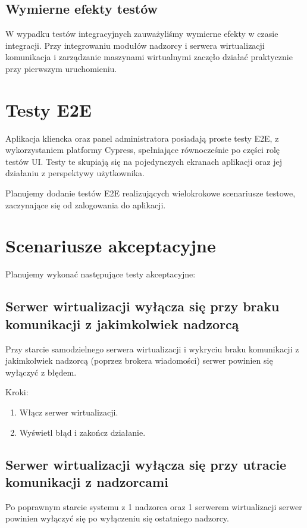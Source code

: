 \documentclass[12pt]{article}
\begin{document}
\subsection {Wymierne efekty testów}
W wypadku testów integracyjnych zauważyliśmy wymierne efekty w czasie integracji.
Przy integrowaniu modułów nadzorcy i serwera wirtualizacji komunikacja i zarządzanie maszynami wirtualnymi zaczęło działać praktycznie przy pierwszym uruchomieniu.

\section{Testy E2E}
Aplikacja kliencka oraz panel administratora posiadają proste testy E2E, z wykorzystaniem platformy Cypress, spełniające równocześnie po części rolę testów UI. Testy te skupiają się na pojedynczych ekranach aplikacji oraz jej działaniu z perspektywy użytkownika.

Planujemy dodanie testów E2E realizujących wielokrokowe scenariusze testowe, zaczynające się od zalogowania do aplikacji.

\section{Scenariusze akceptacyjne}
Planujemy wykonać następujące testy akceptacyjne:

\subsection {Serwer wirtualizacji wyłącza się przy braku komunikacji z jakimkolwiek nadzorcą}
Przy starcie samodzielnego serwera wirtualizacji i wykryciu braku komunikacji z jakimkolwiek nadzorcą (poprzez brokera wiadomości) serwer powinien się wyłączyć z błędem.

Kroki:
\begin{enumerate}
	\item Włącz serwer wirtualizacji.
	\item Wyświetl błąd i zakończ działanie.
\end{enumerate}

\subsection {Serwer wirtualizacji wyłącza się przy utracie komunikacji z nadzorcami}
Po poprawnym starcie systemu z 1 nadzorca oraz 1 serwerem wirtualizacji serwer powinien wyłączyć się po wyłączeniu się ostatniego nadzorcy.
\end{document}
